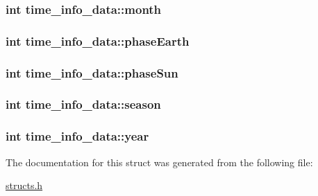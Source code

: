 \hypertarget{structtime__info__data_a22108b21961f4f9cec8b54a4b4c4d84d}{
\subsubsection[{month}]{\setlength{\rightskip}{0pt plus 5cm}int time\-\_\-info\-\_\-data\-::month}}\label{structtime__info__data_a22108b21961f4f9cec8b54a4b4c4d84d}
\hypertarget{structtime__info__data_a9e6037ad4b7b0653cad792c1118b79fb}{
\subsubsection[{phase\-Earth}]{\setlength{\rightskip}{0pt plus 5cm}int time\-\_\-info\-\_\-data\-::phase\-Earth}}\label{structtime__info__data_a9e6037ad4b7b0653cad792c1118b79fb}
\hypertarget{structtime__info__data_aa37cbf721a84db88ea4f3483395360fa}{
\subsubsection[{phase\-Sun}]{\setlength{\rightskip}{0pt plus 5cm}int time\-\_\-info\-\_\-data\-::phase\-Sun}}\label{structtime__info__data_aa37cbf721a84db88ea4f3483395360fa}
\hypertarget{structtime__info__data_ac33501726de03bc8755d9c478703fe45}{
\subsubsection[{season}]{\setlength{\rightskip}{0pt plus 5cm}int time\-\_\-info\-\_\-data\-::season}}\label{structtime__info__data_ac33501726de03bc8755d9c478703fe45}
\hypertarget{structtime__info__data_a9b23c77bd71d154d663750877835b09a}{
\subsubsection[{year}]{\setlength{\rightskip}{0pt plus 5cm}int time\-\_\-info\-\_\-data\-::year}}\label{structtime__info__data_a9b23c77bd71d154d663750877835b09a}


The documentation for this struct was generated from the following file\-:\begin{DoxyCompactItemize}
\item 
\hyperlink{structs_8h}{structs.\-h}\end{DoxyCompactItemize}
